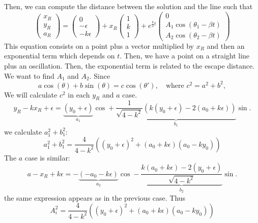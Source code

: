 \documentclass[a4paper,preprint,11pt]{article}
\begin{document}
Then, we can compute the distance between the solution and the line such that
\begin{equation}\label{eq.x0}
\begin{pmatrix} x_R \\ y_R \\ a_R \end{pmatrix} =
\begin{pmatrix} 0 \\ -\epsilon \\ -k\epsilon \end{pmatrix} +
 x_R \begin{pmatrix} 1 \\ k \\ 1 \end{pmatrix} +e^{\frac k 2 t}
 \begin{pmatrix} 0 \\ A_1 \cos(\theta_1-\beta t) \\ A_2 \cos(\theta_2-\beta t)\end{pmatrix}
\end{equation}
This equation consists on a point plus a vector multiplied by $x_R$ and then an exponential term which depends on $t$. Then, we have a point on a straight line plus an oscillation. Then, the exponential term is related to the escape distance. We want to find $A_1$ and $A_2$. Since
$$
a\cos(\theta)+b\sin(\theta)=c\cos(\theta'),\quad\text{where }c^2=a^2+b^2,
$$
We will calculate $c^2$ in each $y_R$ and $a$ case.
$$
y_R-kx_R+\epsilon = \underbrace{(y_0+\epsilon)}_{a_1}\cos + \underbrace{\frac{1}{\sqrt{4-k^2}}(k(y_0+\epsilon)-2(a_0+k\epsilon))}_{b_1}\sin.
$$
we calculate $a_1^2+b_1^2$:
$$
a_1^2+b_1^2 = \frac{4}{4-k^2}((y_0+\epsilon)^2+(a_0+k\epsilon)(a_0-ky_0))
$$
The $a$ case is similar:
$$
a-x_R+k\epsilon = -\underbrace{(-a_0-k\epsilon)}_{a_2}\cos - \underbrace{\frac{k(a_0+k\epsilon)-2(y_0+\epsilon)}{\sqrt{4-k^2}}}_{b_2}\sin. 
$$
the same expression appears as in the previous case. Thus
$$
\boxed{A_i^2 = \frac{4}{4-k^2}((y_0+\epsilon)^2+(a_0+k\epsilon)(a_0-ky_0))}
$$


\end{document}
